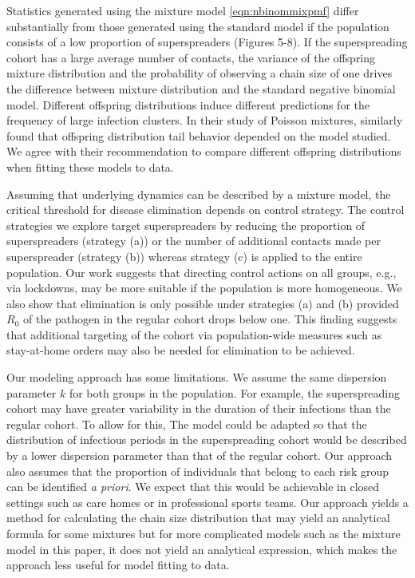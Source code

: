 \documentclass{imammb}
\numberwithin{equation}{section}
\begin{document}
Statistics generated using the mixture model \eqref{eqn:nbinommixpmf} differ substantially from those generated using the standard model if the population consists of a low proportion of superspreaders (Figures 5-8).  If the superspreading cohort has a large average number of contacts, the variance of the offspring mixture distribution and the probability of observing a chain size of one drives the difference between mixture distribution and the standard negative binomial model. Different offspring distributions induce different predictions for the frequency of large infection clusters. In their study of Poisson mixtures, \citet{Kremer2021-bi} similarly found that offspring distribution tail behavior depended on the model studied. We agree with their recommendation to compare different offspring distributions when fitting these models to data. 



Assuming that underlying dynamics can be described by a mixture model, the critical threshold for disease elimination depends on control strategy. The control strategies we explore target superspreaders by reducing the proportion of superspreaders (strategy (a)) or the number of additional contacts made per superspreader (strategy (b)) whereas strategy (c) is applied to the entire population. Our work suggests that directing control actions on all groups, e.g., via lockdowns, may be more suitable if the population is more homogeneous. We also show that elimination is only possible under strategies (a) and (b) provided $R_0$ of the pathogen in the regular cohort drops below one. This finding suggests that additional targeting of the cohort via population-wide measures such as stay-at-home orders may also be needed for elimination to be achieved. 


Our modeling approach has some limitations. We assume the same dispersion parameter $k$ for both groups in the population. For example, the superspreading cohort may have greater variability in the duration of their infections than the regular cohort. To allow for this, The model could be adapted so that the distribution of infectious periods in the superspreading cohort would be described by a lower dispersion parameter than that of the regular cohort. Our approach also assumes that the proportion of individuals that belong to each risk group can be identified \textit{a priori}. We expect that this would be achievable in closed settings such as care homes or in professional sports teams. Our approach yields a method for calculating the chain size distribution that may yield an analytical formula for some mixtures but for more complicated models such as the mixture model in this paper, it does not yield an analytical expression, which makes the approach less useful for model fitting to data.  
\end{document}
